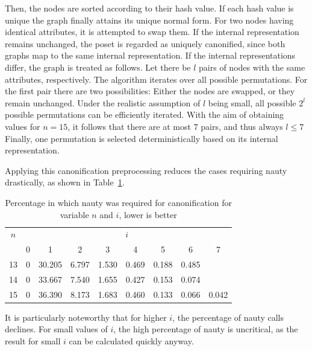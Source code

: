 \documentclass[10pt,journal,compsoc]{IEEEtran}
\begin{document}
Then, the nodes are sorted according to their hash value.
If each hash value is unique the graph finally attains its unique normal form.
For two nodes having identical attributes, it is attempted to swap them.
If the internal representation remains unchanged, the poset is regarded as uniquely canonified, since both graphs map to the same internal representation.
If the internal representations differ, the graph is treated as follows.
Let there be $l$ pairs of nodes with the same attributes, respectively.
The algorithm iterates over all possible permutations.
For the first pair there are two possibilities: Either the nodes are swapped, or they remain unchanged.
Under the realistic assumption of $l$ being small, all possible $2^l$ possible permutations can be efficiently iterated.
With the aim of obtaining values for $n = 15$, it follows that there are at most $7$ pairs, and thus always $l \leq 7$
Finally, one permutation is selected deterministically based on its internal representation.

Applying this canonification preprocessing reduces the cases requiring nauty drastically, as shown in Table~\ref{table:nauty-ratio}.

\begin{table}[!t]
  \renewcommand{\arraystretch}{1.2}
  \caption{Percentage in which nauty was required for canonification for variable $n$ and $i$, lower is better}
  \label{table:nauty-ratio}
  \centering
  \begin{tabular}{c|cccccccc}
    $n$ & \multicolumn{8}{c}{$i$}                                                          \\
        & 0                       & 1      & 2     & 3     & 4     & 5     & 6     & 7     \\ \hline
    13  & 0                       & 30.205 & 6.797 & 1.530 & 0.469 & 0.188 & 0.485         \\
    14  & 0                       & 33.667 & 7.540 & 1.655 & 0.427 & 0.153 & 0.074         \\
    15  & 0                       & 36.390 & 8.173 & 1.683 & 0.460 & 0.133 & 0.066 & 0.042 \\
  \end{tabular}
\end{table}

It is particularly noteworthy that for higher $i$, the percentage of nauty calls declines.
For small values of $i$, the high percentage of nauty is uncritical, as the result for small $i$ can be calculated quickly anyway.
\end{document}

